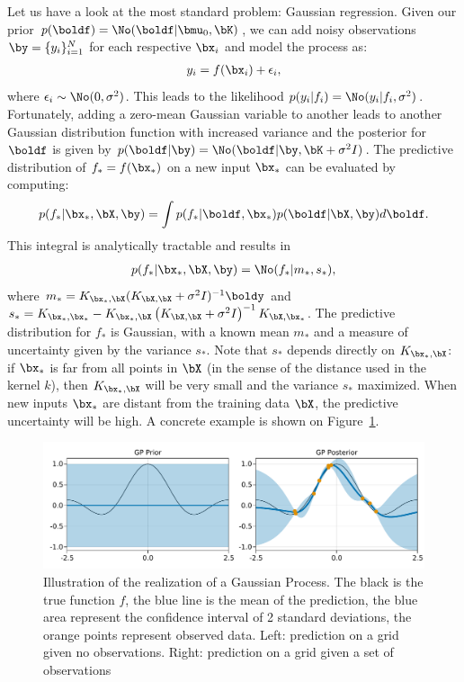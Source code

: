 Let us have a look at the most standard problem: Gaussian regression.
Given our prior $p(\boldf) = \No(\boldf|\bmu_0, \bK)$, we can add noisy observations $\by = \{y_i\}_{i=1}^N$ for each respective $\bx_i$ and model the process as:
\begin{align}
y_i = f(\bx_i) + \epsilon_i,
\end{align}
where $\epsilon_i \sim \No(0,\sigma^2)$.
This leads to the likelihood $p(y_i|f_i) = \No(y_i|f_i, \sigma^2)$.
Fortunately, adding a zero-mean Gaussian variable to another leads to another Gaussian distribution function with increased variance and the posterior for $\boldf$ is given by $p(\boldf|\by) = \No(\boldf|\by, \bK + \sigma^2 I)$.
The predictive distribution of $f_*=f(\bx_*)$ on a new input $\bx_*$ can be evaluated by computing:
\begin{align}
p(f_*|\bx_*,\bX,\by) = \int p(f_*|\boldf,\bx_*)p(\boldf|\bX,\by)d\boldf.
\end{align}	
This integral is analytically tractable and results in 
\begin{align}
    p(f_*|\bx_*,\bX,\by)=\No(f_*|m_*,s_*),
    \label{eq:pred_gp}
\end{align}
where $m_* = K_{\bx_*,\bX}(K_{\bX,\bX} + \sigma^{2}I)^{-1}\boldy$ and $s_*=K_{\bx_*,\bx_*} - K_{\bx_*,\bX}\left(K_{\bX,\bX}+\sigma^2I\right)^{-1}K_{\bX,\bx_*}$.
The predictive distribution for $f_*$ is Gaussian, with a known mean $m_*$ and a measure of uncertainty given by the variance $s_*$.
Note that $s_*$ depends directly on $K_{\bx_*,\bX}$: if $\bx_*$ is far from all points in $\bX$ (in the sense of the distance used in the kernel $k$), then $K_{\bx_*,\bX}$ will be very small and the variance $s_*$ maximized.
When new inputs $\bx_*$ are distant from the training data $\bX$, the predictive uncertainty will be high.
A concrete example is shown on Figure~\ref{fig:gp_example}.

\begin{figure}
    \includegraphics[width=\textwidth]{./chapters/2_background/figures/GP_example.pdf}
    \caption{Illustration of the realization of a Gaussian Process. The black is the true function $f$, the blue line is the mean of the prediction, the blue area represent the confidence interval of 2 standard deviations, the orange points represent observed data. Left: prediction on a grid given no observations. Right: prediction on a grid given a set of observations}
    \label{fig:gp_example}
\end{figure}

